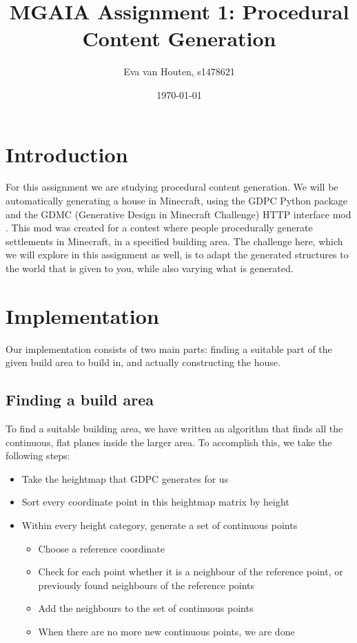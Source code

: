\documentclass[10pt]{article}
\title{MGAIA Assignment 1: Procedural Content Generation}
\date{\today}
\author{Eva van Houten, s1478621}
\begin{document}
\maketitle

\section{Introduction}
For this assignment we are studying procedural content generation. We will be automatically generating a house in Minecraft, using the GDPC Python package \cite{GDPC} and the GDMC (Generative Design in Minecraft Challenge) \cite{GDMC} HTTP interface mod \cite{mod}. This mod was created for a contest where people procedurally generate settlements in Minecraft, in a specified building area. The challenge here, which we will explore in this assignment as well, is to adapt the generated structures to the world that is given to you, while also varying what is generated.

\section{Implementation}
Our implementation consists of two main parts: finding a suitable part of the given build area to build in, and actually constructing the house.
\subsection{Finding a build area}
To find a suitable building area, we have written an algorithm that finds all the continuous, flat planes inside the larger area. To accomplish this, we take the following steps:
\begin{itemize}
    \item Take the heightmap that GDPC generates for us
    \item Sort every coordinate point in this heightmap matrix by height
    \item Within every height category, generate a set of continuous points
          \begin{itemize}
              \item Choose a reference coordinate
              \item Check for each point whether it is a neighbour of the reference point, or previously found neighbours of the reference points
              \item Add the neighbours to the set of continuous points
              \item When there are no more new continuous points, we are done
          \end{itemize}
\end{itemize}
\end{document}
